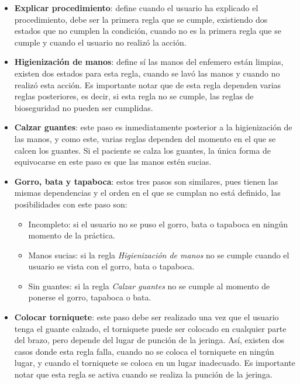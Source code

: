 \begin{itemize}
\item \textbf{Explicar procedimiento}: define cuando el usuario ha explicado el
    procedimiento, debe ser la primera regla que se cumple, existiendo dos
    estados que no cumplen la condición, cuando no es la primera regla que se
    cumple y cuando el usuario no realizó la acción.

\item \textbf{Higienización de manos}: define sí las manos del enfemero están
    limpias, existen dos estados para esta regla, cuando se lavó las manos y
    cuando no realizó esta acción. Es importante notar que de esta regla
    dependen varias reglas posteriores, es decir, si esta regla no se cumple,
    las reglas de bioseguridad no pueden ser cumplidas.

\item \textbf{Calzar guantes}: este paso es inmediatamente posterior a la
    higienización de las manos, y como este, varias reglas dependen del momento
    en el que se calcen los guantes. Si el paciente se calza los guantes, la
    única forma de equivocarse en este paso es que las manos estén sucias.

\item \textbf{Gorro, bata y tapaboca}: estos tres pasos son similares, pues
    tienen las mismas dependencias y el orden en el que se cumplan no está
    definido, las posibilidades con este paso son:
    \begin{itemize}
    \item Incompleto: si el usuario no se puso el gorro, bata o tapaboca en
        ningún momento de la práctica.
    \item Manos sucias: si la regla \emph{Higienización de manos} no se cumple
        cuando el usuario se vista con el gorro, bata o tapaboca.
    \item Sin guantes: si la regla \emph{Calzar guantes} no se cumple al momento
        de ponerse el gorro, tapaboca o bata. 
    \end{itemize}
    
\item \textbf{Colocar torniquete}: este paso debe ser realizado una vez que el
    usuario tenga el guante calzado, el torniquete puede ser colocado en
    cualquier parte del brazo, pero depende del lugar de punción de la jeringa.
    Así, existen dos casos donde esta regla falla, cuando no se coloca el
    torniquete en ningún lugar, y cuando el torniquete se coloca en un lugar
    inadecuado. Es importante notar que esta regla se activa cuando se realiza
    la punción de la jeringa.


\end{itemize}
